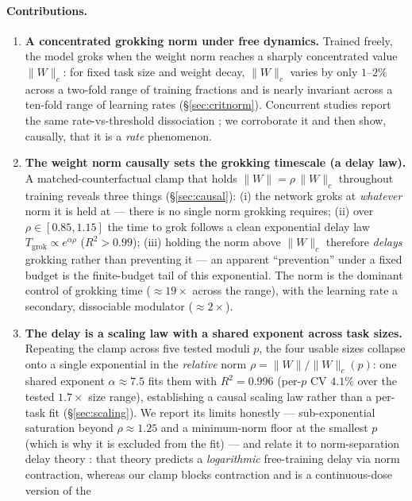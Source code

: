 \documentclass[10pt,twocolumn]{article}
\newcommand{\Wc}{\|W\|_{c}}
\begin{document}
\paragraph{Contributions.}
\begin{enumerate}[leftmargin=*, itemsep=1pt, topsep=2pt]
\item \textbf{A concentrated grokking norm under free dynamics.}
  Trained freely, the model groks when the weight norm reaches a sharply concentrated value $\Wc$: for fixed
  task size and weight decay, $\Wc$ varies by only $1$--$2\%$ across a two-fold range of training fractions
  and is nearly invariant across a ten-fold range of learning rates (\S\ref{sec:critnorm}). Concurrent
  studies report the same rate-vs-threshold dissociation \citep{systematic2026grokking,neuralcollapse2026};
  we corroborate it and then show, causally, that it is a \emph{rate} phenomenon.
\item \textbf{The weight norm causally sets the grokking timescale (a delay law).}
  A matched-counterfactual clamp that holds $\|W\|=\rho\,\Wc$ throughout training reveals three things
  (\S\ref{sec:causal}): (i) the network groks at \emph{whatever} norm it is held at --- there is no single
  norm grokking requires; (ii) over $\rho\in[0.85,1.15]$ the time to grok follows a clean exponential delay
  law $T_{\mathrm{grok}}\propto e^{\alpha\rho}$ ($R^2>0.99$); (iii) holding the norm above $\Wc$ therefore
  \emph{delays} grokking rather than preventing it --- an apparent ``prevention'' under a fixed budget is the
  finite-budget tail of this exponential. The norm is the dominant control of grokking time
  ($\approx\!19\times$ across the range), with the learning rate a secondary, dissociable modulator
  ($\approx\!2\times$).
\item \textbf{The delay is a scaling law with a shared exponent across task sizes.}
  Repeating the clamp across five tested moduli $p$, the four usable sizes collapse onto a single exponential
  in the \emph{relative} norm $\rho=\|W\|/\Wc(p)$: one shared exponent $\alpha\approx7.5$ fits them with
  $R^2=0.996$ (per-$p$ CV $4.1\%$ over the tested $1.7\times$ size range), establishing a causal scaling law
  rather than a per-task fit (\S\ref{sec:scaling}). We report its limits honestly --- sub-exponential saturation beyond $\rho\approx1.25$
  and a minimum-norm floor at the smallest $p$ (which is why it is excluded from the fit) --- and relate it to norm-separation delay theory
  \citep{truong2026normsep}: that theory predicts a \emph{logarithmic} free-training
  delay via norm contraction, whereas our clamp blocks contraction and is a continuous-dose version of the

\end{enumerate}
\end{document}
